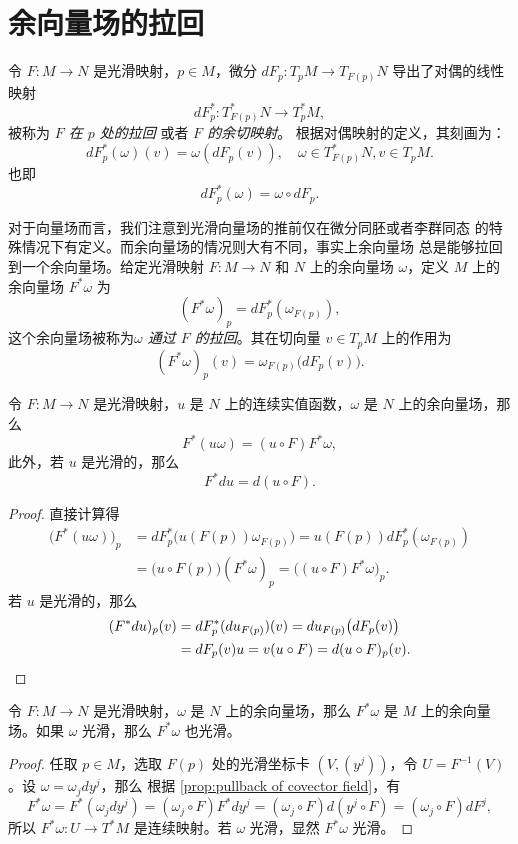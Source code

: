 \documentclass[fontset=none]{Notes}
\begin{document}
\section{余向量场的拉回}

令 $F:M\to N$ 是光滑映射，$p\in M$，微分 $dF_p:T_pM\to T_{F(p)}N$
导出了对偶的线性映射
\[
  dF_p^*:T_{F(p)}^*N\to T_p^*M,  
\]
被称为 \emph{$F$ 在 $p$ 处的拉回} 或者 \emph{$F$ 的余切映射}。
根据对偶映射的定义，其刻画为：
\[
  dF_p^*(\omega)(v)= \omega(dF_p(v)),\quad \omega\in T_{F(p)}^*N,
  v\in T_pM.
\]
也即
\[
  dF_p^*(\omega)=\omega\circ dF_p.  
\]

对于向量场而言，我们注意到光滑向量场的推前仅在微分同胚或者李群同态
的特殊情况下有定义。而余向量场的情况则大有不同，事实上余向量场
总是能够拉回到一个余向量场。给定光滑映射 $F:M\to N$ 和
$N$ 上的余向量场 $\omega$，定义 $M$ 上的余向量场 $F^*\omega$
为
\[
  (F^*\omega)_p =dF_p^*(\omega_{F(p)}),
\]
这个余向量场被称为\emph{$\omega$ 通过 $F$ 的拉回}。其在切向量 $v\in T_pM$
上的作用为
\[
  (F^*\omega)_p(v)=\omega_{F(p)}\bigl(dF_p(v)\bigr)  .
\]

\begin{proposition}\label{prop:pullback of covector field}
  令 $F:M\to N$ 是光滑映射，$u$ 是 $N$ 上的连续实值函数，$\omega$ 是
  $N$ 上的余向量场，那么
  \[
    F^*(u\omega)=(u\circ F)F^*\omega,  
  \]
  此外，若 $u$ 是光滑的，那么
  \[
    F^*du=d(u\circ F).  
  \]
\end{proposition}
\begin{proof}
  直接计算得
  \begin{align*}
    \bigl(F^*(u\omega)\bigr)_p&=dF_p^*\bigl(u(F(p))\omega_{F(p)}\bigr)
    =u(F(p))dF_p^*(\omega_{F(p)})\\
    &=\bigl(u\circ F(p)\bigr) (F^*\omega)_p=\bigl((u\circ F)F^*\omega\bigr)_p.
  \end{align*}
  若 $u$ 是光滑的，那么
  \begin{align*}
    (F^*du)_p(v)&=dF_p^*(du_{F(p)})(v)=du_{F(p)}\bigl(dF_p(v)\bigr)\\
    &=dF_p(v)u=v(u\circ F)=d(u\circ F)_p(v).\qedhere
  \end{align*}
\end{proof}

\begin{proposition}
  令 $F:M\to N$ 是光滑映射，$\omega$ 是
  $N$ 上的余向量场，那么 $F^*\omega$ 是 $M$ 上的余向量场。如果
  $\omega$ 光滑，那么 $F^*\omega$ 也光滑。
\end{proposition}
\begin{proof}
  任取 $p\in M$，选取 $F(p)$ 处的光滑坐标卡 $(V,(y^j))$，令
  $U=F^{-1}(V)$。设 $\omega=\omega_jdy^j$，那么
  根据 \autoref{prop:pullback of covector field}，有
  \[
    F^*\omega=F^*\left(\omega_jdy^j\right)=
    (\omega_j\circ F)F^*dy^j=
    (\omega_j\circ F)d(y^j\circ F)=(\omega_j\circ F)dF^j,  
  \]
  所以 $F^*\omega:U\to T^*M$ 是连续映射。若 $\omega$ 光滑，显然
  $F^*\omega$ 光滑。
\end{proof}
\end{document}
